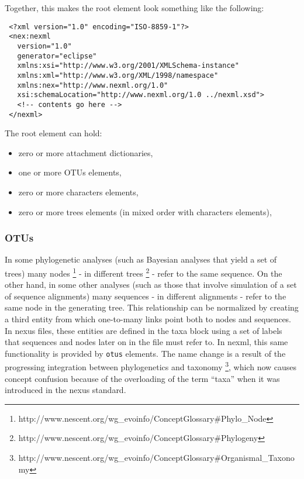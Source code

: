 \documentclass{article}
\newcommand{\code}{\texttt}
\begin{document}
Together, this makes the root element look something like the following:
\begin{verbatim}
 <?xml version="1.0" encoding="ISO-8859-1"?>
 <nex:nexml 
   version="1.0" 
   generator="eclipse"
   xmlns:xsi="http://www.w3.org/2001/XMLSchema-instance"
   xmlns:xml="http://www.w3.org/XML/1998/namespace"
   xmlns:nex="http://www.nexml.org/1.0"
   xsi:schemaLocation="http://www.nexml.org/1.0 ../nexml.xsd">
   <!-- contents go here -->
 </nexml>
\end{verbatim}
The root element can hold:

\begin{itemize}

\item zero or more attachment dictionaries, 

\item one or more OTUs elements, 

\item zero or more characters elements, 

\item zero or more trees elements (in mixed order with characters elements),

\end{itemize}

\subsubsection{OTUs}

In some phylogenetic analyses (such as Bayesian analyses that yield a set of trees) many nodes 
\footnote{http://www.nescent.org/wg\_evoinfo/ConceptGlossary\#Phylo\_Node} - in different trees 
\footnote{http://www.nescent.org/wg\_evoinfo/ConceptGlossary\#Phylogeny} - refer to the same sequence. On the other hand, in some 
other analyses (such as those that involve simulation of a set of sequence alignments) many sequences - in different alignments - 
refer to the same node in the generating tree. This relationship can be normalized by creating a third entity from which one-to-many 
links point both to nodes and sequences. In nexus files, these entities are defined in the taxa block using a set of labels that 
sequences and nodes later on in the file must refer to. In nexml, this same functionality is provided by \code{otus} elements. 
The name change is a result of the progressing integration between phylogenetics and taxonomy 
\footnote{http://www.nescent.org/wg\_evoinfo/ConceptGlossary\#Organismal\_Taxonomy}, which now causes concept confusion because of the 
overloading of the term ``taxa'' when it was introduced in the nexus standard.
\end{document}
